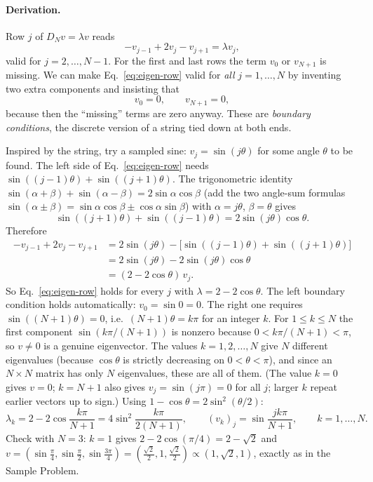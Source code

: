 \paragraph{Derivation.} Row $j$ of $D_Nv=\lambda v$ reads
\begin{equation}
-v_{j-1}+2v_j-v_{j+1}=\lambda v_j,
\label{eq:eigen-row}
\end{equation}
valid for $j=2,\dots,N-1$. For the first and last rows the term $v_0$ or $v_{N+1}$ is missing. We can make Eq.~\eqref{eq:eigen-row} valid for \emph{all} $j=1,\dots,N$ by inventing two extra components and insisting that
\begin{equation}
v_0=0,\qquad v_{N+1}=0,
\label{eq:eigen-bc}
\end{equation}
because then the ``missing'' terms are zero anyway. These are \emph{boundary conditions}, the discrete version of a string tied down at both ends.

Inspired by the string, try a sampled sine: $v_j=\sin(j\theta)$ for some angle $\theta$ to be found. The left side of Eq.~\eqref{eq:eigen-row} needs $\sin((j-1)\theta)+\sin((j+1)\theta)$. The trigonometric identity $\sin(\alpha+\beta)+\sin(\alpha-\beta)=2\sin\alpha\cos\beta$ (add the two angle-sum formulas $\sin(\alpha\pm\beta)=\sin\alpha\cos\beta\pm\cos\alpha\sin\beta$) with $\alpha=j\theta$, $\beta=\theta$ gives
\begin{equation}
\sin((j+1)\theta)+\sin((j-1)\theta)=2\sin(j\theta)\cos\theta.
\end{equation}
Therefore
\begin{align}
-v_{j-1}+2v_j-v_{j+1}&=2\sin(j\theta)-\bigl[\sin((j-1)\theta)+\sin((j+1)\theta)\bigr]\\
&=2\sin(j\theta)-2\sin(j\theta)\cos\theta\\
&=(2-2\cos\theta)\,v_j.
\end{align}
So Eq.~\eqref{eq:eigen-row} holds for every $j$ with $\lambda=2-2\cos\theta$. The left boundary condition holds automatically: $v_0=\sin0=0$. The right one requires $\sin((N+1)\theta)=0$, i.e.\ $(N+1)\theta=k\pi$ for an integer $k$. For $1\le k\le N$ the first component $\sin(k\pi/(N+1))$ is nonzero because $0<k\pi/(N+1)<\pi$, so $v\ne0$ is a genuine eigenvector. The values $k=1,2,\dots,N$ give $N$ different eigenvalues (because $\cos\theta$ is strictly decreasing on $0<\theta<\pi$), and since an $N\times N$ matrix has only $N$ eigenvalues, these are all of them. (The value $k=0$ gives $v=0$; $k=N+1$ also gives $v_j=\sin(j\pi)=0$ for all $j$; larger $k$ repeat earlier vectors up to sign.) Using $1-\cos\theta=2\sin^2(\theta/2)$:
\begin{equation}
\boxed{\lambda_k=2-2\cos\frac{k\pi}{N+1}=4\sin^2\frac{k\pi}{2(N+1)},\qquad (v_k)_j=\sin\frac{jk\pi}{N+1},\qquad k=1,\dots,N.}
\label{eq:eigen-DN-eig}
\end{equation}
Check with $N=3$: $k=1$ gives $2-2\cos(\pi/4)=2-\sqrt2$ and $v=(\sin\frac\pi4,\sin\frac\pi2,\sin\frac{3\pi}4)=(\tfrac{\sqrt2}2,1,\tfrac{\sqrt2}2)\propto(1,\sqrt2,1)$, exactly as in the Sample Problem.


